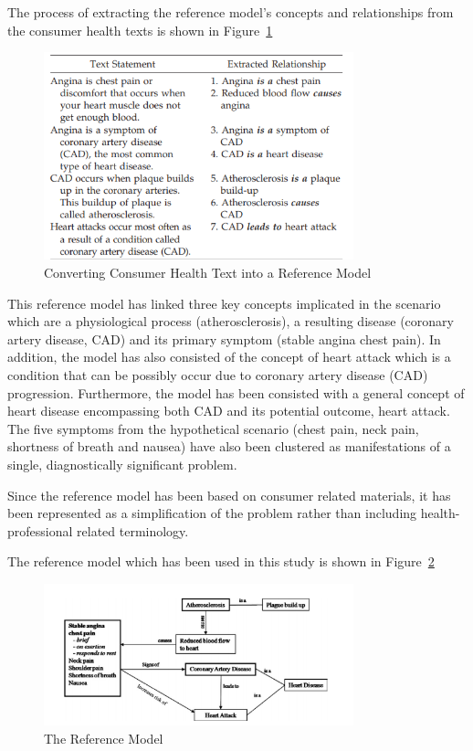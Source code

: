 \documentclass[]{article}
\begin{document}
The process of extracting the reference model’s concepts and relationships from the consumer health texts is shown in Figure~\ref{fig6}

\begin{figure}[t!]
	\includegraphics[width=0.8\textwidth]{Capture6.png}
	\caption{Converting Consumer Health Text into a Reference Model\label{fig6}}
\end{figure}

This reference model has linked three key concepts implicated in the scenario which are a physiological process (atherosclerosis), a resulting disease (coronary artery disease, CAD) and its primary symptom (stable angina chest pain). In addition, the model has also consisted of the concept of heart attack which is a condition that can be possibly occur due to coronary artery disease (CAD) progression. Furthermore, the model has been consisted with a general concept of heart disease encompassing both CAD and its potential outcome, heart attack. The five symptoms from the hypothetical scenario (chest pain, neck pain, shortness of breath and nausea) have also been clustered as manifestations of a single, diagnostically significant problem. 

Since the reference model has been based on consumer related materials, it has been represented as a simplification of the problem rather than including health-professional related terminology.

The reference model which has been used in this study is shown in Figure~\ref{fig7}

\begin{figure}[b!]
	\includegraphics[width=0.8\textwidth]{Capture7.png}
	\caption{The Reference Model\label{fig7}}
\end{figure}
\end{document}
